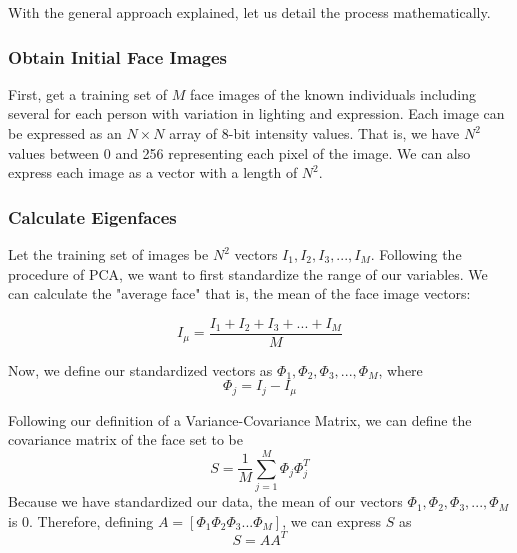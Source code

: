 \documentclass{article}
\begin{document}
\noindent With the general approach explained, let us detail the process mathematically. 

\subsubsection{Obtain Initial Face Images}

First, get a training set of $M$ face images of the known individuals including several for each person with variation in lighting and expression. Each image can be expressed as an $N \times N$ array of 8-bit intensity values. That is, we have $N^2$ values between 0 and 256 representing each pixel of the image. We can also express each image as a vector with a length of $N^2$.

\subsubsection{Calculate Eigenfaces}
Let the training set of images be $N^2$ vectors $I_1,I_2,I_3,...,I_M$. Following the procedure of PCA, we want to first standardize the range of our variables. We can calculate the "average face" that is, the mean of the face image vectors:

$$I_\mu = \frac{I_1 + I_2 + I_3 +...+ I_M}{M}$$

\noindent Now, we define our standardized vectors as $\Phi_1, \Phi_2, \Phi_3,...,\Phi_M$, where
$$\Phi_j = I_j - I_\mu$$

\noindent Following our definition of a Variance-Covariance Matrix, we can define the covariance matrix of the face set to be
$$S = \frac{1}{M}\sum_{j=1}^{M}\Phi_j\Phi_j^T$$
\noindent Because we have standardized our data, the mean of our vectors $\Phi_1, \Phi_2, \Phi_3,...,\Phi_M$ is 0. Therefore, defining $A = [\Phi_1 \Phi_2 \Phi_3 ... \Phi_M]$, we can express $S$ as
$$S = AA^T$$
\end{document}
